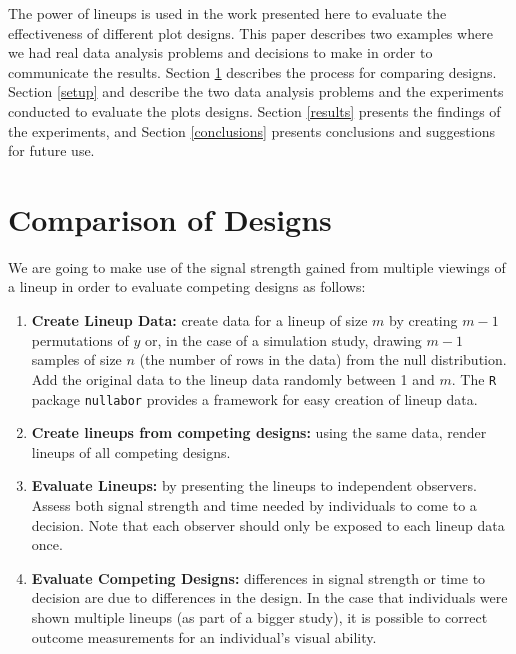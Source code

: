%
%
% 

The power of lineups is used in the work presented here to evaluate the effectiveness of different plot designs. This paper describes two examples where we had real data analysis problems and decisions to make in order to communicate the results. Section \ref{designs} describes the process for comparing designs. Section \ref{setup} and describe the two data analysis problems and the experiments conducted to evaluate the plots designs. Section \ref{results} presents the findings of the experiments, and Section \ref{conclusions} presents conclusions and suggestions for future use.

\section{Comparison of Designs}\label{designs}
We are going to make use of the signal strength gained from multiple viewings of a lineup in order to evaluate competing designs as follows:
\begin{enumerate}
\item{{\bf Create Lineup Data:} create data for a lineup of size $m$ by  creating  $m-1$ permutations of $y$ or, in the case of a simulation study, drawing $m-1$ samples of size $n$ (the number of rows in the data) from the null distribution. Add the original data to the lineup data randomly between 1 and $m$. The {\tt R} package {\tt nullabor} provides a framework for easy creation of lineup data. }
\item{{\bf Create lineups from competing designs:} using the same data, render lineups of all competing designs. }
\item{{\bf Evaluate Lineups:} by presenting the lineups to independent observers. Assess both signal strength and time needed by individuals to come to a decision. Note that each observer should only be exposed to each lineup data once.}
\item{{\bf Evaluate Competing Designs:} differences in signal strength or time to decision are due to differences in the design. In the case that individuals were shown multiple lineups (as part of a bigger study), it is possible to correct outcome measurements for an individual's visual ability. }
\end{enumerate}

